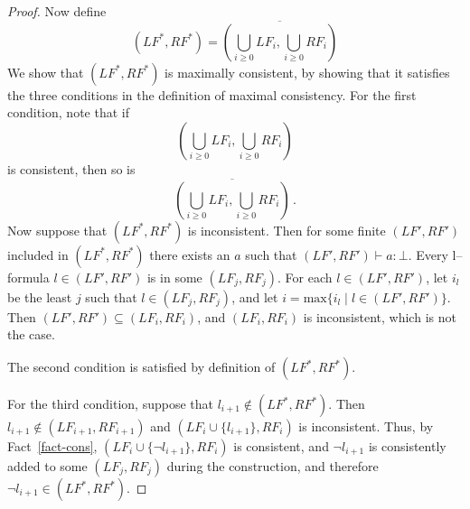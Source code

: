 \documentclass[times, 10pt]{article}
\newcommand{\LF}{\mathit{LF}}
\newcommand{\RF}{\mathit{RF}}
\begin{document}
\begin{proof}
  Now define
  \begin{displaymath}
  (\LF^*,\RF^*) = \overline{(\bigcup_{i \geq 0} \LF_i, \bigcup_{i \geq 0} \RF_i)}
  \end{displaymath}
  We show that $(\LF^*,\RF^*)$ is maximally consistent, by showing that it satisfies the three 
  conditions in the definition of maximal consistency.  For the first condition, note that if
  \begin{displaymath}
  (\bigcup_{i \geq 0} \LF_i, \bigcup_{i \geq 0} \RF_i)
  \end{displaymath}
  is consistent, then so is
  \begin{displaymath}
  \overline{(\bigcup_{i \geq 0} \LF_i, \bigcup_{i \geq 0} \RF_i)}\,.
  \end{displaymath}
  Now suppose that $(\LF^*,\RF^*)$ is inconsistent.  Then for
  some finite $(\LF',\RF')$ included in $(\LF^*,\RF^*)$
  there exists an $a$ such that $(\LF',\RF') \vdash a:\bot$.
  Every l--formula $l \in (\LF',\RF')$ is in some
  $(\LF_j,\RF_j)$.  For each $l \in (\LF',\RF')$, let
  $i_l$ be the least $j$ such that $l \in (\LF_j,\RF_j)$, and
  let $i = \mbox{max}\{i_l \mid l \in (\LF',\RF')\}$.  Then
  $(\LF',\RF') \subseteq (\LF_i,\RF_i)$, and
  $(\LF_i,\RF_i)$ is inconsistent, which is not the case.
  
  The second condition is satisfied by definition of $(\LF^*,\RF^*)$.  
  
  For the third condition, suppose that $l_{i+1} \not\in (\LF^*,\RF^*)$.  Then 
  $l_{i+1} \not\in (\LF_{i+1},\RF_{i+1})$ and $(\LF_i \cup \{l_{i+1}\},\RF_i)$ 
  is inconsistent.  Thus, by Fact~\ref{fact-cons}, $(\LF_i \cup \{\neg l_{i+1}\},\RF_i)$
  is consistent, and $\neg l_{i+1}$ is consistently added to some $(\LF_j,\RF_j)$ 
  during the construction, and therefore $\neg l_{i+1} \in (\LF^*,\RF^*)$. 
\end{proof}
\end{document}
